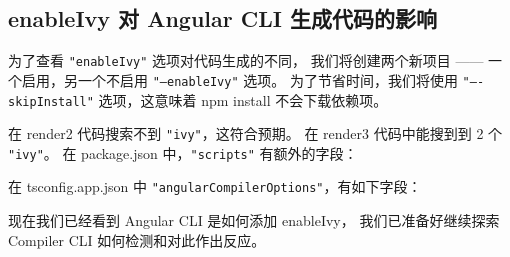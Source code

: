 \subsection{enableIvy 对 Angular CLI 生成代码的影响}


为了查看 \texttt{"enableIvy"} 选项对代码生成的不同，
我们将创建两个新项目 —— 一个启用，另一个不启用 \texttt{"--enableIvy"} 选项。
为了节省时间，我们将使用 \texttt{"–-skipInstall"} 选项，这意味着 npm install 不会下载依赖项。




在 render2 代码搜索不到 \texttt{"ivy"}，这符合预期。
在 render3 代码中能搜到到 2 个 \texttt{"ivy"}。
在 package.json 中，\texttt{"scripts"} 有额外的字段：




在 tsconfig.app.json 中 \texttt{"angularCompilerOptions"}，有如下字段：




现在我们已经看到 Angular CLI 是如何添加 enableIvy，
我们已准备好继续探索 Compiler CLI 如何检测和对此作出反应。
